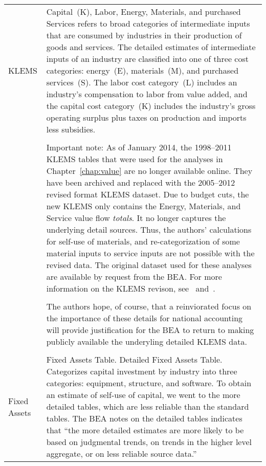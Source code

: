 \begin{table}
\begin{center}
\begin{tabular}{l @{\hspace{2em}} p{10cm}}
KLEMS 		& 	Capital~(K), Labor, Energy, Materials, and purchased Services
				refers to broad categories of intermediate inputs 
				that are consumed by industries in their production 
				of goods and services.\cite{Strassner:2005aa}
				The detailed estimates of intermediate inputs of an industry 
				are classified into one of three cost categories:
				energy~(E), materials~(M), and purchased services~(S).
				The labor cost category~(L) includes an industry’s compensation 
				to labor from value added, 
				and the capital cost category~(K) includes the industry’s 
				gross operating surplus plus taxes on production and imports less subsidies.  \\
			&	\\
			& 	Important note: As of January 2014, the 1998--2011 KLEMS tables
				that were used for the analyses in Chapter~\ref{chap:value} are 
				no longer available online. They have been archived and replaced 
				with the 2005--2012 revised format KLEMS dataset. Due to budget
				cuts, the new
				KLEMS only contains the Energy, Materials, and Service
				value flow \emph{totals}. It no longer captures the underlying detail
				sources. Thus, the authors' calculations for self-use of
				materials, and re-categorization of some material inputs
				to service inputs are not possible with the revised data.
				The original dataset used for these analyses are available
				by request from the BEA\@. For more information
				on the KLEMS revison, see~\cite{kim2014} and~\cite{BEAKLEMSData}.\\
			&	\\
			& 	The authors hope, of course, that a reinviorated focus on
				the importance of these details for national accounting
				will provide justification for the BEA to return to 
				making publicly available the underyling detailed KLEMS data.\\
			& 	\\
Fixed Assets &	Fixed Assets Table. Detailed Fixed Assets Table. 
				Categorizes capital investment by industry into three categories:
				equipment, structure, and software. 
				To obtain an estimate of self-use of capital, 
				we went to the more detailed tables, 
				which are less reliable than the standard tables. 
				The BEA notes on the detailed tables indicates that 
				``the more detailed estimates are more likely to be based on judgmental trends, 
				on trends in the higher level aggregate, 
				or on less reliable source data.''~\cite[Table~2.5]{BEADetailedData}\\
    \bottomrule
  \end{tabular}

\end{center}
\label{tab:data_definitions}
\end{table}

